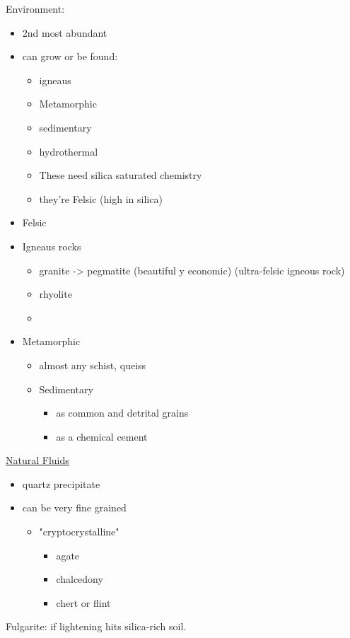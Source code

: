 \documentclass[11pt]{article}
\begin{document}
Environment:
\begin{itemize}
\item 2nd most abundant
\item can grow or be found:
\begin{itemize}
\item igneaus
\item Metamorphic
\item sedimentary
\item hydrothermal
\item These need silica saturated chemistry
\item they're Felsic (high in silica)
\end{itemize}

\item Felsic
\item Igneaus rocks
\begin{itemize}
\item granite -> pegmatite (beautiful y economic) (ultra-felsic igneous rock)
\item rhyolite
\item 
\end{itemize}
\item Metamorphic
\begin{itemize}
\item almost any schist, queiss
\item Sedimentary
\begin{itemize}
\item as common and detrital grains
\item as a chemical cement
\end{itemize}
\end{itemize}
\end{itemize}

\uline{Natural Fluids}
\begin{itemize}
\item quartz precipitate
\item can be very fine grained
\begin{itemize}
\item "cryptocrystalline"
\begin{itemize}
\item agate
\item chalcedony
\item chert or flint
\end{itemize}
\end{itemize}
\end{itemize}

Fulgarite: if lightening hits silica-rich soil.
\end{document}
